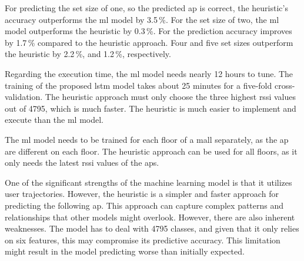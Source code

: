 For predicting the set size of one, so the predicted \ac{ap} is correct, the heuristic's accuracy outperforms the \ac{ml} model by 3.5\,\%.
For the set size of two, the \ac{ml} model outperforms the heuristic by 0.3\,\%.
For \threeAP the prediction accuracy improves by 1.7\,\% compared to the heuristic approach.
Four and five set sizes outperform the heuristic by 2.2\,\%, and 1.2\,\%, respectively.

Regarding the execution time, the \ac{ml} model needs nearly 12 hours to tune.
The training of the proposed \ac{lstm} model takes about 25 minutes for a five-fold cross-validation.
The heuristic approach must only choose the three highest \ac{rssi} values out of 4795, which is much faster.
The heuristic is much easier to implement and execute than the \ac{ml} model.

The \ac{ml} model needs to be trained for each floor of a mall separately, as the \ac{ap} are different on each floor.
The heuristic approach can be used for all floors, as it only needs the latest \ac{rssi} values of the \acp{ap}.

One of the significant strengths of the machine learning model is that it utilizes user trajectories.
However, the heuristic is a simpler and faster approach for predicting the following \ac{ap}.
This approach can capture complex patterns and relationships that other models might overlook.
However, there are also inherent weaknesses.
The model has to deal with 4795 classes, and given that it only relies on six features, this may compromise its predictive accuracy.
This limitation might result in the model predicting worse than initially expected.
